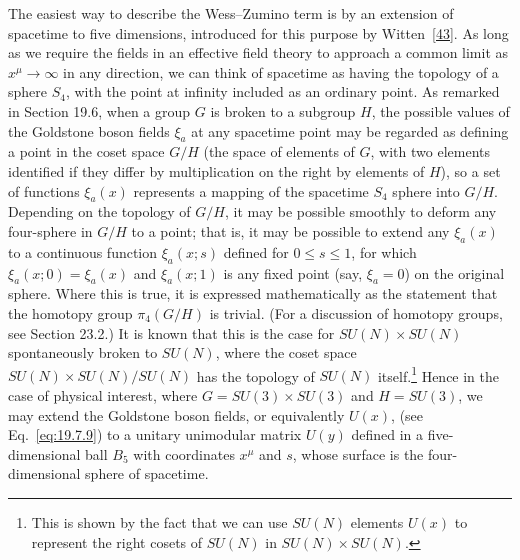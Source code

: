 The easiest way to describe the Wess--Zumino term is by an extension of spacetime to five dimensions, introduced for this purpose by Witten~\hyperref[ch19-ref-43]{[43]}. As long as we require the fields in an effective field theory to approach a common limit as $x^\mu\to\infty$ in any direction, we can think of spacetime as having the topology of a sphere $S_4$, with the point at infinity included as an ordinary point. As remarked in Section 19.6, when a group $G$ is broken to a subgroup $H$, the possible values of the Goldstone boson fields $\xi_a$ at any spacetime point may be regarded as defining a point in the coset space $G/H$ (the space of elements of $G$, with two elements identified if they differ by multiplication on the right by elements of $H$), so a set of functions $\xi_a(x)$ represents a mapping of the spacetime $S_4$ sphere into $G/H$. Depending on the topology of $G/H$, it may be possible smoothly to deform any four-sphere in $G/H$ to a point; that is, it may be possible to extend any $\xi_a(x)$ to a continuous function $\xi_a(x;s)$ defined for $0\leq s\leq1$, for which $\xi_a(x;0)=\xi_a(x)$ and $\xi_a(x;1)$ is any fixed point (say, $\xi_a=0$) on the original sphere. Where this is true, it is expressed mathematically as the statement that the homotopy group $\pi_4(G/H)$ is trivial. (For a discussion of homotopy groups, see Section 23.2.) It is known that this is the case for $SU(N)\times SU(N)$ spontaneously broken to $SU(N)$, where the coset space $SU(N)\times SU(N)/SU(N)$ has the topology of $SU(N)$ itself.\footnote{This is shown by the fact that we can use $SU(N)$ elements $U(x)$ to represent the right cosets of $SU(N)$ in $SU(N)\times SU(N)$.} Hence in the case of physical interest, where $G=SU(3)\times SU(3)$ and $H=SU(3)$, we may extend the Goldstone boson fields, or equivalently $U(x)$, (see Eq.~\eqref{eq:19.7.9}) to a unitary unimodular matrix $U(y)$ defined in a five-dimensional ball $B_5$ with coordinates $x^\mu$ and $s$, whose surface is the four-dimensional sphere of spacetime.

